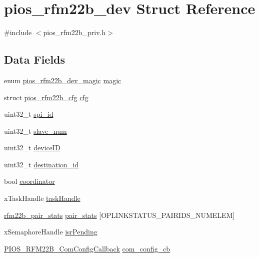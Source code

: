 \hypertarget{structpios__rfm22b__dev}{\section{pios\-\_\-rfm22b\-\_\-dev \-Struct \-Reference}
\label{structpios__rfm22b__dev}
}


{\ttfamily \#include $<$pios\-\_\-rfm22b\-\_\-priv.\-h$>$}

\subsection*{\-Data \-Fields}
\begin{DoxyCompactItemize}
\item 
enum \hyperlink{group___p_i_o_s___r_f_m22_b_ga25f646fb6abded1e9f076ca00e13cbec}{pios\-\_\-rfm22b\-\_\-dev\-\_\-magic} \hyperlink{structpios__rfm22b__dev_acffebca4153749f86cd6237ac4482f3a}{magic}
\item 
struct \hyperlink{structpios__rfm22b__cfg}{pios\-\_\-rfm22b\-\_\-cfg} \hyperlink{structpios__rfm22b__dev_a2fc3047fbb17be7e546cab4e24ee2b28}{cfg}
\item 
uint32\-\_\-t \hyperlink{structpios__rfm22b__dev_a7fae761882f21a9a0088db1f81dd41da}{spi\-\_\-id}
\item 
uint32\-\_\-t \hyperlink{structpios__rfm22b__dev_a4e0db01351dfac40720073969a7fafae}{slave\-\_\-num}
\item 
uint32\-\_\-t \hyperlink{structpios__rfm22b__dev_ac608ccb62cbd144c8053aaacb8c14fcf}{device\-I\-D}
\item 
uint32\-\_\-t \hyperlink{structpios__rfm22b__dev_ada47e039e7ba782c44b154fce01005eb}{destination\-\_\-id}
\item 
bool \hyperlink{structpios__rfm22b__dev_a37c2eab9f05656b3ef5690689b0e06c9}{coordinator}
\item 
x\-Task\-Handle \hyperlink{structpios__rfm22b__dev_a28c619aaf7379eacea11f08847223cc2}{task\-Handle}
\item 
\hyperlink{structrfm22b__pair__stats}{rfm22b\-\_\-pair\-\_\-stats} \hyperlink{structpios__rfm22b__dev_a6db8d809d116a414eb5c7a826c833bc5}{pair\-\_\-stats} \mbox{[}\-O\-P\-L\-I\-N\-K\-S\-T\-A\-T\-U\-S\-\_\-\-P\-A\-I\-R\-I\-D\-S\-\_\-\-N\-U\-M\-E\-L\-E\-M\mbox{]}
\item 
x\-Semaphore\-Handle \hyperlink{structpios__rfm22b__dev_a9e681596408e8e6d5387ecdd43acfe62}{isr\-Pending}
\item 
\hyperlink{group___p_i_o_s___r_f_m22_b_gaa8a316480e010f5e383d29257c0686cd}{\-P\-I\-O\-S\-\_\-\-R\-F\-M22\-B\-\_\-\-Com\-Config\-Callback} \hyperlink{structpios__rfm22b__dev_abed55ffe3e0e2832d958e692f9310b6e}{com\-\_\-config\-\_\-cb}

\end{DoxyCompactItemize}

